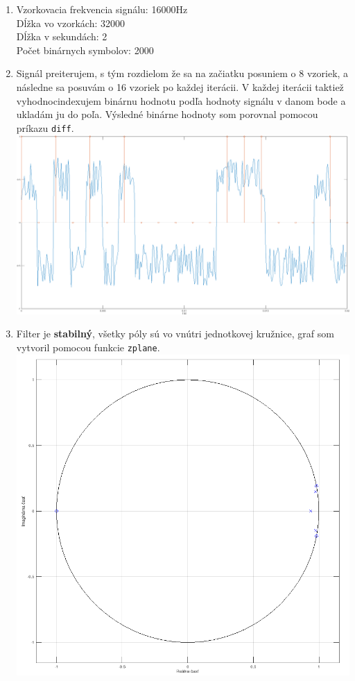 \documentclass[a4paper,12pt,twocolumn]{article}
\begin{document}
\begin{enumerate}
\item
Vzorkovacia frekvencia signálu: 16000Hz\\
Dĺžka vo vzorkách: 32000\\
Dĺžka v sekundách: 2\\
Počet binárnych symbolov: 2000
\item
Signál preiterujem, s tým rozdielom že sa na začiatku posuniem o 8 vzoriek, a následne sa posuvám o 16 vzoriek po každej iterácii. V každej iterácii taktiež vyhodnocindexujem binárnu hodnotu podľa hodnoty signálu v danom bode a ukladám ju do poľa. Výsledné binárne hodnoty som porovnal pomocou príkazu \texttt{diff}.
\includegraphics[width=\linewidth]{2}
\item
Filter je \textbf{stabilný}, všetky póly sú vo vnútri jednotkovej kružnice, graf som vytvoril pomocou funkcie \texttt{zplane}.
\includegraphics[width=\linewidth]{3}

\end{enumerate}
\end{document}

